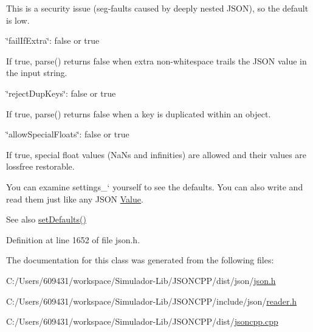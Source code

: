 \begin{DoxyItemize}
\begin{DoxyItemize}
\item This is a security issue (seg-\/faults caused by deeply nested J\+S\+ON), so the default is low.
\end{DoxyItemize}
\item {\ttfamily \char`\"{}fail\+If\+Extra\char`\"{}\+: false or true}
\begin{DoxyItemize}
\item If true, {\ttfamily parse()} returns false when extra non-\/whitespace trails the J\+S\+ON value in the input string.
\end{DoxyItemize}
\item {\ttfamily \char`\"{}reject\+Dup\+Keys\char`\"{}\+: false or true}
\begin{DoxyItemize}
\item If true, {\ttfamily parse()} returns false when a key is duplicated within an object.
\end{DoxyItemize}
\item {\ttfamily \char`\"{}allow\+Special\+Floats\char`\"{}\+: false or true}
\begin{DoxyItemize}
\item If true, special float values (Na\+Ns and infinities) are allowed and their values are lossfree restorable.
\end{DoxyItemize}
\end{DoxyItemize}

You can examine \textquotesingle{}settings\+\_\+` yourself to see the defaults. You can also write and read them just like any J\+S\+ON \hyperlink{class_json_1_1_value}{Value}. \begin{DoxySeeAlso}{See also}
\hyperlink{class_json_1_1_char_reader_builder_a03ff031e06aabff989ab4addc87294ab}{set\+Defaults()} 
\end{DoxySeeAlso}


Definition at line 1652 of file json.\+h.



The documentation for this class was generated from the following files\+:\begin{DoxyCompactItemize}
\item 
C\+:/\+Users/609431/workspace/\+Simulador-\/\+Lib/\+J\+S\+O\+N\+C\+P\+P/dist/json/\hyperlink{dist_2json_2json_8h}{json.\+h}\item 
C\+:/\+Users/609431/workspace/\+Simulador-\/\+Lib/\+J\+S\+O\+N\+C\+P\+P/include/json/\hyperlink{reader_8h}{reader.\+h}\item 
C\+:/\+Users/609431/workspace/\+Simulador-\/\+Lib/\+J\+S\+O\+N\+C\+P\+P/dist/\hyperlink{jsoncpp_8cpp}{jsoncpp.\+cpp}\end{DoxyCompactItemize}
